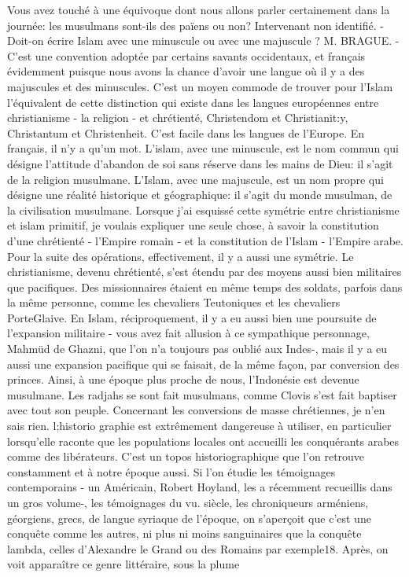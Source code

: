 Vous avez touché à une équivoque dont nous allons parler certainement dans la journée: les musulmans sont-ils des païens ou non?
Intervenant non identifié. - Doit-on écrire Islam avec une minuscule ou avec une majuscule ?
\newline M. BRAGUE. -  C'est une convention adoptée par certains savants occidentaux, et français évidemment puisque nous avons la chance d'avoir une langue où il y a des majuscules et des minuscules. C'est un moyen commode de trouver pour l'Islam l'équivalent de cette distinction qui existe dans les langues européennes entre christianisme - la religion - et chrétienté, Christendom et Christianit:y, Christantum et Christenheit. C'est facile dans les langues de l'Europe. En français, il n'y a qu'un mot.
L'islam, avec une minuscule, est le nom commun qui désigne l'attitude d'abandon de soi sans réserve dans les mains de Dieu: il s'agit de la religion musulmane. L'Islam, avec une majuscule, est un nom propre qui désigne une réalité historique et géographique: il s'agit du monde musulman, de la civilisation musulmane.
Lorsque j'ai esquissé cette symétrie entre christianisme et islam primitif, je voulais expliquer une seule chose, à savoir la constitution d'une chrétienté - l'Empire romain - et la constitution de l'Islam - l'Empire arabe. Pour la suite des opérations, effectivement, il y a aussi une symétrie. Le christianisme, devenu chrétienté, s'est étendu par des moyens aussi bien militaires que pacifiques. Des missionnaires étaient en même temps des soldats, parfois dans la même personne, comme les chevaliers Teutoniques et les chevaliers PorteGlaive. En Islam, réciproquement, il y a eu aussi bien une poursuite de l'expansion militaire - vous avez fait allusion à ce sympathique personnage, Mahmüd de Ghazni, que l'on n'a toujours pas oublié aux Indes-, mais il y a eu aussi une expansion pacifique qui se faisait, de la même façon, par conversion des princes. Ainsi, à une époque plus proche de nous, l'Indonésie est devenue musulmane. Les radjahs se sont fait musulmans, comme Clovis s'est fait baptiser avec tout son peuple.
Concernant les conversions de masse chrétiennes, je n'en sais rien. l;historio­
graphie est extrêmement dangereuse à utiliser, en particulier lorsqu'elle raconte que les populations locales ont accueilli les conquérants arabes comme des libérateurs. C'est un topos historiographique que l'on retrouve constamment et à notre époque aussi. Si l'on étudie les témoignages contemporains - un Américain, Robert Hoyland, les a récemment recueillis dans un gros volume-, les témoignages du vu. siècle, les chroniqueurs arméniens, géorgiens, grecs, de langue syriaque de l'époque, on s'aperçoit que c'est une conquête comme les autres, ni plus ni moins sanguinaires que la conquête lambda, celles d'Alexandre le Grand ou des Romains par exemple18. Après, on voit apparaître ce genre littéraire, sous la plume
